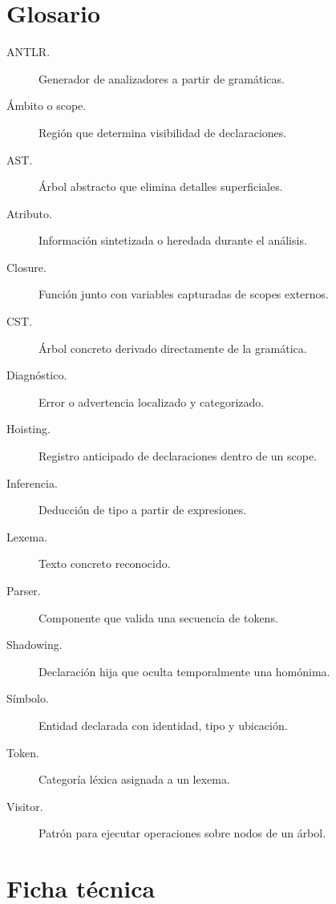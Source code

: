 \documentclass[11pt,letterpaper,oneside]{report}
\begin{document}
\chapter{Glosario}

\begin{description}
  \item[ANTLR.] Generador de analizadores a partir de gramáticas.
  \item[Ámbito o scope.] Región que determina visibilidad de declaraciones.
  \item[AST.] Árbol abstracto que elimina detalles superficiales.
  \item[Atributo.] Información sintetizada o heredada durante el análisis.
  \item[Closure.] Función junto con variables capturadas de scopes externos.
  \item[CST.] Árbol concreto derivado directamente de la gramática.
  \item[Diagnóstico.] Error o advertencia localizado y categorizado.
  \item[Hoisting.] Registro anticipado de declaraciones dentro de un scope.
  \item[Inferencia.] Deducción de tipo a partir de expresiones.
  \item[Lexema.] Texto concreto reconocido.
  \item[Parser.] Componente que valida una secuencia de tokens.
  \item[Shadowing.] Declaración hija que oculta temporalmente una homónima.
  \item[Símbolo.] Entidad declarada con identidad, tipo y ubicación.
  \item[Token.] Categoría léxica asignada a un lexema.
  \item[Visitor.] Patrón para ejecutar operaciones sobre nodos de un árbol.
\end{description}

\chapter{Ficha técnica}
\end{document}
